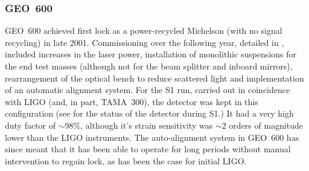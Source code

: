 \documentclass{article}
\begin{document}
\subsubsection{GEO~600}
GEO~600 achieved first lock as a power-recycled Michelson (with no signal
recycling) in late 2001. Commissioning over the following year, detailed in
\cite{Hewitson:2003}, included increases in the laser power, installation of
monolithic suspensions for the end test masses (although not for the beam
splitter and inboard mirrors), rearrangement of the optical bench to reduce
scattered light and implementation of an automatic alignment system. For the S1
run, carried out in coincidence with LIGO (and, in part, TAMA~300), the detector
was kept in this configuration (see \cite{Abbott:2004a} for the status of the
detector during S1.) It had a very high duty factor of $\sim98\%$, although
it's strain sensitivity was $\sim2$ orders of magnitude lower than the LIGO
instruments. The auto-alignment system in GEO~600 has since meant that it has
been able to operate for long periods without manual intervention to regain
lock, as has been the case for initial LIGO.

\end{document}
